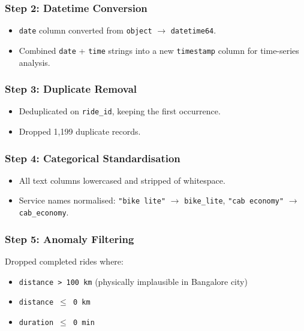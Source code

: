 \documentclass[12pt,a4paper]{article}
\begin{document}
\subsubsection{Step 2: Datetime Conversion}
\begin{itemize}
  \item \texttt{date} column converted from \texttt{object} $\rightarrow$ \texttt{datetime64}.
  \item Combined \texttt{date} + \texttt{time} strings into a new \texttt{timestamp} column for time-series analysis.
\end{itemize}

\subsubsection{Step 3: Duplicate Removal}
\begin{itemize}
  \item Deduplicated on \texttt{ride\_id}, keeping the first occurrence.
  \item Dropped 1,199 duplicate records.
\end{itemize}

\subsubsection{Step 4: Categorical Standardisation}
\begin{itemize}
  \item All text columns lowercased and stripped of whitespace.
  \item Service names normalised: \texttt{"bike lite"} $\rightarrow$ \texttt{bike\_lite}, \texttt{"cab economy"} $\rightarrow$ \texttt{cab\_economy}.
\end{itemize}

\subsubsection{Step 5: Anomaly Filtering}
Dropped completed rides where:
\begin{itemize}
  \item \texttt{distance > 100 km} (physically implausible in Bangalore city)
  \item \texttt{distance $\leq$ 0 km}
  \item \texttt{duration $\leq$ 0 min}
\end{itemize}
\end{document}
